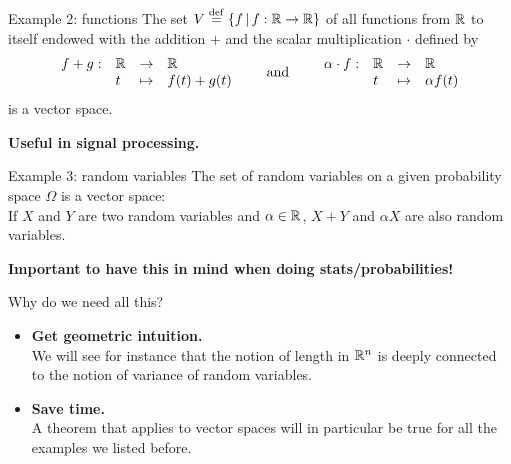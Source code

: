 \documentclass{beamer}
\begin{document}
\begin{frame}[t]{Example 2: functions}
	The set \quad $V \overset{\rm def}{=} \{ f \, | \, f: \mathbb{R} \to \mathbb{R} \}$ \quad of all functions from $\mathbb{R}$ to itself endowed with the addition $+$ and the scalar multiplication $\cdot$ defined by
	$$
	\begin{array}{rlll}
		f+g :& \mathbb{R} & \to & \mathbb{R} \\
			 &t & \mapsto & f(t) + g(t)
	\end{array}
	\qquad
	\text{and}
	\qquad
	\begin{array}{rlll}
		\alpha \cdot f :& \mathbb{R} & \to & \mathbb{R} \\
						&t & \mapsto & \alpha f(t)
	\end{array}
	$$
	is a vector space.
	\vspace{3cm}
	\begin{center}
		\textbf{Useful in signal processing.}
	\end{center}
\end{frame}

\begin{frame}{Example 3: random variables}
	The set of random variables on a given probability space $\Omega$ is a vector space: 
	\\
	If $X$ and $Y$ are two random variables and $\alpha \in \mathbb{R}$, $X+Y$ and $\alpha X$ are also random variables.

	\vspace{0.8cm}
	\begin{center}
		\textbf{Important to have this in mind when doing stats/probabilities!}
	\end{center}
\end{frame}

\begin{frame}{Why do we need all this?}
			\vspace{-0.5cm}
	\begin{itemize}
		\item {\bf Get geometric intuition.} 
			\\
			\vspace{0.1cm}
			We will see for instance that the notion of length in $\mathbb{R}^n$ is deeply connected to the notion of variance of random variables.
			\vspace{1.1cm}
		\item {\bf Save time.} \\ 
			\vspace{0.1cm}
			A theorem that applies to vector spaces will in particular be true for all the examples we listed before.
	\end{itemize}
\end{frame}
\end{document}
